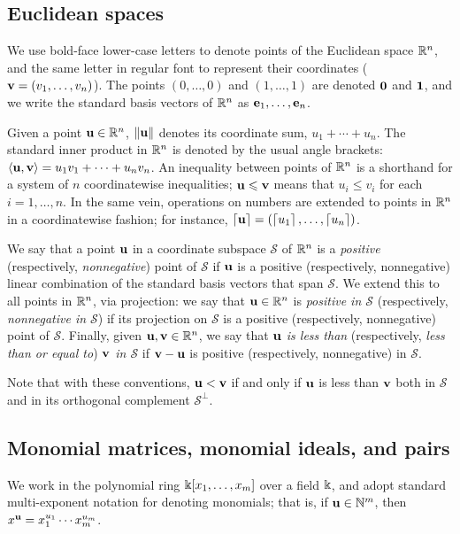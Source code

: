 \documentclass{amsart}
\begin{document}
\subsection{Euclidean spaces}
\label{ss: euclidean spaces and convexity}
We use bold-face lower-case letters to denote points of the Euclidean space $\mathbb{R}^n$, and the same letter in regular font to represent their coordinates (\eg $\mathbf{v}=(v_1,\ldots,v_n)$).
The points $(0,\ldots,0)$ and $(1,\ldots,1)$ are denoted $\mathbf{0}$ and $\mathbf{1}$, and we write the standard basis vectors of $\mathbb{R}^n$ as $\mathbf{e}_1,\ldots,\mathbf{e}_n$.

Given a point $\mathbf{u}\in \mathbb{R}^n$, $\| \mathbf{u} \|$ denotes its coordinate sum, $u_1+\cdots+u_n$.
The standard inner product in $\mathbb{R}^n$ is denoted by the usual angle brackets: $\langle \mathbf{u}, \mathbf{v} \rangle = u_1v_1 + \cdots + u_nv_n$.
An inequality between points of $\mathbb{R}^n$ is a shorthand for a system of $n$ coordinatewise inequalities; \eg $\mathbf{u}\leqslant \mathbf{v}$ means that $u_i \le v_i$ for each $i=1,\ldots,n$.
In the same vein, operations on numbers are extended to points in $\mathbb{R}^n$ in a coordinatewise fashion; for instance, $\left\lceil \mathbf{u} \right\rceil=(\left\lceil u_1 \right\rceil,\ldots,\left\lceil u_n \right\rceil)$.

We say that a point $\mathbf{u}$ in a coordinate subspace $\mathcal{S}$ of $\mathbb{R}^n$ is a \emph{positive} (respectively, \emph{nonnegative}) point of $\mathcal{S}$ if $\mathbf{u}$ is a positive (respectively, nonnegative) linear combination of the standard basis vectors that span $\mathcal{S}$.
We extend this to all points in $\mathbb{R}^n$, via projection: we say that $\mathbf{u} \in \mathbb{R}^n$ is \emph{positive in $\mathcal{S}$} (respectively, \emph{nonnegative in $\mathcal{S}$}) if its projection on $\mathcal{S}$ is a positive (respectively, nonnegative) point of $\mathcal{S}$.
Finally, given $\mathbf{u},\mathbf{v}\in \mathbb{R}^n$, we say that \emph{$\mathbf{u}$ is less than} (respectively, \emph{less than or equal to}) \emph{$\mathbf{v}$ in $\mathcal{S}$} if $\mathbf{v}-\mathbf{u}$ is positive (respectively, nonnegative) in $\mathcal{S}$.

Note that with these conventions, $\mathbf{u} < \mathbf{v}$ if and only if $\mathbf{u}$ is less than $\mathbf{v}$ both in $\mathcal{S}$ and in its orthogonal complement $\mathcal{S}^\perp$.

\subsection{Monomial matrices, monomial ideals, and pairs}
\label{monomial newton preliminaries: ss}

We work in the polynomial ring $\Bbbk[x_1, \ldots, x_m]$ over a field $\Bbbk$, and adopt standard multi-exponent notation for denoting monomials; that is, if $\mathbf{u} \in \mathbb{N}^m$, then $x^{\mathbf{u}} = x_1^{u_1} \cdots x_m^{u_m}$.
\end{document}
